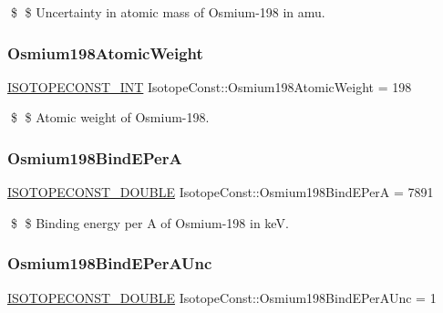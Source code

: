 \$ \$ Uncertainty in atomic mass of Osmium-\/198 in amu. \mbox{\label{group___isotope_const-_osmium-_os198_ga78f6ca6604d50102d85e75cbec666de5}} 
\subsubsection{\texorpdfstring{Osmium198\+Atomic\+Weight}{Osmium198AtomicWeight}}
{\footnotesize\ttfamily \mbox{\hyperlink{group___isotope_const-_macros_ga5f18360b3e99483a35c32d789e62621c}{I\+S\+O\+T\+O\+P\+E\+C\+O\+N\+S\+T\+\_\+\+I\+NT}} Isotope\+Const\+::\+Osmium198\+Atomic\+Weight = 198}

\$ \$ Atomic weight of Osmium-\/198. \mbox{\label{group___isotope_const-_osmium-_os198_ga8fc39a87c3949c14652536a978ba7114}} 
\subsubsection{\texorpdfstring{Osmium198\+Bind\+E\+PerA}{Osmium198BindEPerA}}
{\footnotesize\ttfamily \mbox{\hyperlink{group___isotope_const-_macros_ga8f45a7272ce02c0b4c65c44636ed719a}{I\+S\+O\+T\+O\+P\+E\+C\+O\+N\+S\+T\+\_\+\+D\+O\+U\+B\+LE}} Isotope\+Const\+::\+Osmium198\+Bind\+E\+PerA = 7891}

\$ \$ Binding energy per A of Osmium-\/198 in keV. \mbox{\label{group___isotope_const-_osmium-_os198_ga737b1f0c304f768a794c32c40b55525d}} 
\subsubsection{\texorpdfstring{Osmium198\+Bind\+E\+Per\+A\+Unc}{Osmium198BindEPerAUnc}}
{\footnotesize\ttfamily \mbox{\hyperlink{group___isotope_const-_macros_ga8f45a7272ce02c0b4c65c44636ed719a}{I\+S\+O\+T\+O\+P\+E\+C\+O\+N\+S\+T\+\_\+\+D\+O\+U\+B\+LE}} Isotope\+Const\+::\+Osmium198\+Bind\+E\+Per\+A\+Unc = 1}

